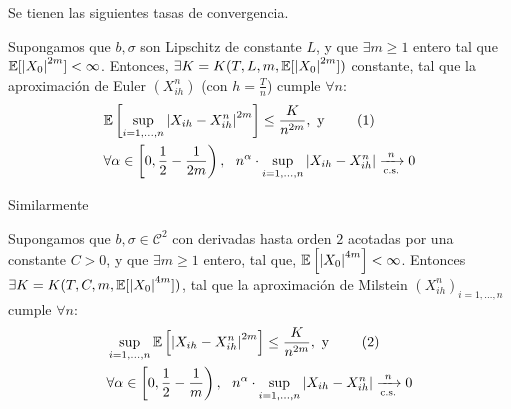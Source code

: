  Se tienen las siguientes tasas de convergencia. 
 \begin{theorem}
         Supongamos que $b, \sigma$ son Lipschitz de constante $L$, y que $\exists m \ge  1$ entero 
         tal que $\mathbb{E} [\abs{X_0}^{2m}] < \infty$. Entonces, $\exists K = K(T,L,m,\mathbb{E}[\abs{X_0}^{2m}])$ 
         constante, tal que la aproximación de Euler $(X_{ih}^{n})$ (con $h = \frac{T}{n}$) cumple 
         $\forall n$: 
         \begin{align*}
                 \label{eq:sde_4}
                 &\mathbb{E} \left[ \sup_{i = 1,\ldots, n} \abs{X_{ih} - X_{ih}^n}^{2m} \right] \le \frac{K}{n^{2m}}, 
                 \text{ y } \tag{1} \\
                 &\forall \alpha \in \left\lbrack 0, \frac{1}{2} - \frac{1}{2m} \right ), ~ ~ 
                 n^{\alpha} \cdot \sup_{i= 1 ,\ldots, n} \abs{X_{ih} -
                 X_{ih}^{n}} \xrightarrow[\text{c.s.}]{n} 0
         \end{align*}
         
 \end{theorem}

 Similarmente

\begin{theorem}
        Supongamos que $b, \sigma \in \mathcal{C}^2$ con derivadas hasta orden $2$ acotadas por una 
        constante $C >0$, y que $\exists m \ge 1$ entero, tal que, $\mathbb{E} \left[
                \abs{X_0}^{4m} \right] < \infty$. Entonces $\exists K = K(T,C,m,\mathbb{E}[\abs{X_0}^{4m}])$,
        tal que la aproximación de Milstein $(X_{ih}^{n})_{i = 1, \ldots,n}$ cumple $\forall n$: 
        \begin{align*}
                \label{eq:sde_5}
                &\sup_{i = 1,\ldots,n} \mathbb{E} \left[ \abs{X_{ih} - X_{ih}^{n}}^{2m}
                \right] \le \frac{K}{n^{2m}}, \text{ y } \tag{2}\\
                 &\forall \alpha \in \left \lbrack 0, \frac{1}{2} - \frac{1}{m} \right), ~ ~ 
                 n^{\alpha} \cdot \sup_{i= 1 ,\ldots, n} \abs{X_{ih} -
                 X_{ih}^{n}} \xrightarrow[\text{c.s.}]{n} 0
        \end{align*}
\end{theorem}

